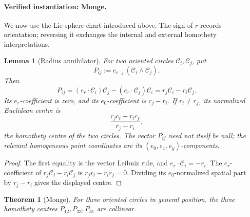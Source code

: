 \documentclass[11pt]{article}
\newtheorem{theorem}{Theorem}
\newtheorem{lemma}{Lemma}
\begin{document}
\paragraph{Verified instantiation: Monge.}

We now use the Lie-sphere chart introduced above. The sign of \(r\) records
orientation; reversing it exchanges the internal and external homothety
interpretations.

\begin{lemma}[Radius annihilator]
\label{lem:radius-annihilator}
For two oriented circles \(\mathcal C_i,\mathcal C_j\), put
\[
 P_{ij}:=e_r\mathbin{\lrcorner}
       (\mathcal C_i\wedge\mathcal C_j).
 \]
Then
\[
 P_{ij}
 = (e_r\cdot\mathcal C_i)\mathcal C_j
   -(e_r\cdot\mathcal C_j)\mathcal C_i
 =r_j\mathcal C_i-r_i\mathcal C_j.
\]
Its \(e_r\)-coefficient is zero, and its \(e_0\)-coefficient is
\(r_j-r_i\). If \(r_i\ne r_j\), its normalized Euclidean centre is
\[
 \frac{r_j c_i-r_i c_j}{r_j-r_i},
\]
the homothety centre of the two circles. The vector \(P_{ij}\) need not
itself be null; the relevant homogeneous point coordinates are its
\((e_0,e_x,e_y)\)-components.
\end{lemma}

\begin{proof}
The first equality is the vector Leibniz rule, and
\(e_r\cdot\mathcal C_i=-r_i\). The \(e_r\)-coefficient of
\(r_j\mathcal C_i-r_i\mathcal C_j\) is
\(r_jr_i-r_ir_j=0\). Dividing its \(e_0\)-normalized spatial part by
\(r_j-r_i\) gives the displayed centre.
\end{proof}

\begin{theorem}[Monge]
\label{thm:monge}
For three oriented circles in general position, the three homothety centres
\(P_{12},P_{23},P_{31}\) are collinear.
\end{theorem}
\end{document}
